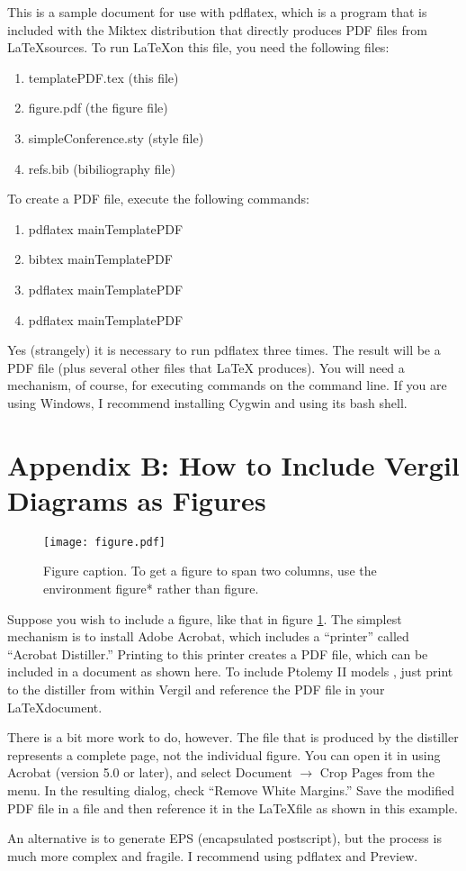 \documentclass[10pt,twocolumn]{article}
\begin{document}
This is a sample document for use with pdflatex, which is
a program that is included with the Miktex distribution
that directly produces PDF files from \LaTeX sources.
To run \LaTeX on this file, you need the following files:
\begin{enumerate}
\item templatePDF.tex (this file)
\item figure.pdf (the figure file)
\item simpleConference.sty (style file)
\item refs.bib (bibiliography file)
\end{enumerate}
\noindent
To create a PDF file, execute the following commands:
\begin{enumerate}
\item pdflatex mainTemplatePDF
\item bibtex mainTemplatePDF
\item pdflatex mainTemplatePDF
\item pdflatex mainTemplatePDF
\end{enumerate}
\noindent
Yes (strangely) it is necessary to run pdflatex three times.
The result will be a PDF file (plus several other files that \LaTeX
produces).  You will need a mechanism, of course, for executing
commands on the command line. If you are using Windows, I recommend
installing Cygwin and using its bash shell.

\section{Appendix B: How to Include Vergil Diagrams as Figures}

\begin{figure}[!b]
  \begin{center}
    \texttt{[image: figure.pdf]}
  \end{center}

  \caption{\small Figure caption. To get a figure to span two
      columns, use the environment figure* rather than figure.}
  \label{fig-label}
\end{figure}


Suppose you wish to include a figure, like that in figure \ref{fig-label}.
The simplest mechanism is to install Adobe Acrobat, which includes
a ``printer'' called ``Acrobat Distiller.'' Printing to this printer
creates a PDF file, which can be included in a document as shown
here.  To include Ptolemy II models \cite{PtolemyVol1:04},
just print to the distiller from within Vergil and reference
the PDF file in your \LaTeX document.

There is a bit more work to do, however.
The file that is produced by the distiller represents
a complete page, not the individual figure.
You can open it in using Acrobat (version 5.0 or later),
and select Document $\rightarrow$ Crop Pages from the menu.
In the resulting dialog, check ``Remove White Margins.''
Save the modified PDF file in a file and then reference
it in the \LaTeX file as shown in this example.

An alternative is to generate EPS (encapsulated postscript),
but the process is much more complex and fragile.
I recommend using pdflatex and Preview.



\end{document}
